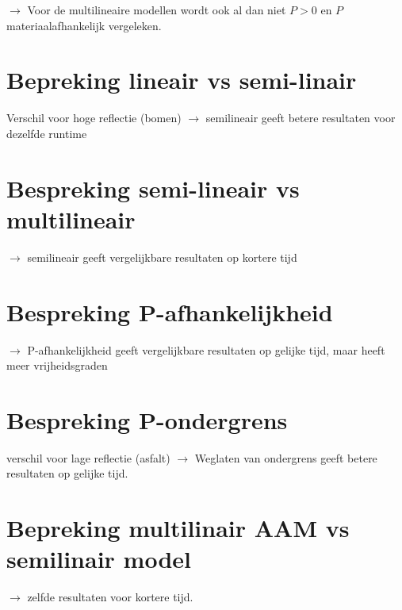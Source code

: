 \documentclass[12pt]{report}
\begin{document}
$\rightarrow$ Voor de multilineaire modellen wordt ook al dan niet $P> 0$ en $P$ materiaalafhankelijk vergeleken.



\section{Bepreking lineair vs semi-linair}

Verschil voor hoge reflectie (bomen)
$\rightarrow$ semilineair geeft betere resultaten voor dezelfde runtime

\section{Bespreking semi-lineair vs multilineair}

$\rightarrow$ semilineair geeft vergelijkbare resultaten op kortere tijd

\section{Bespreking P-afhankelijkheid}

$\rightarrow$ P-afhankelijkheid geeft vergelijkbare resultaten op gelijke tijd, maar heeft meer vrijheidsgraden

\section{Bespreking P-ondergrens}

verschil voor lage reflectie (asfalt)
$\rightarrow$ Weglaten van ondergrens geeft betere resultaten op gelijke tijd.

\section{Bepreking multilinair AAM vs semilinair model}

$\rightarrow$ zelfde resultaten voor kortere tijd.

\begin{appendices}


\end{appendices}


\begin{flushleft}
\nocite{*}
{}


\end{flushleft}
\end{document}

